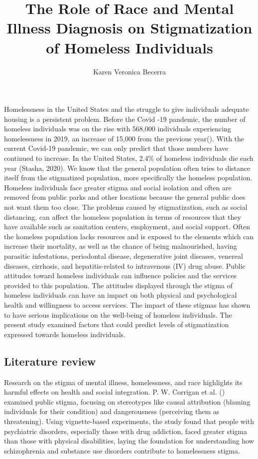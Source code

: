\documentclass[
  man,
  floatsintext,
  longtable,
  nolmodern,
  notxfonts,
  notimes,
  colorlinks=true,linkcolor=blue,citecolor=blue,urlcolor=blue]{apa7}
\title{The Role of Race and Mental Illness Diagnosis on Stigmatization
of Homeless Individuals}
\author{Karen Veronica Becerra}
\affiliation{
{Department of Psychology, The University of Chicago}}
\begin{document}
\maketitle


\setcounter{secnumdepth}{-\maxdimen} %

\setlength\LTleft{0pt}


Homelessness in the United States and the struggle to give individuals
adequate housing is a persistent problem. Before the Covid -19 pandemic,
the number of homeless individuals was on the rise with 568,000
individuals experiencing homelessness in 2019, an increase of 15,000
from the previous
year(). With the
current Covid-19 pandemic, we can only predict that those numbers have
continued to increase. In the United States, 2.4\% of homeless
individuals die each year (Stasha, 2020). We know that the general
population often tries to distance itself from the stigmatized
population, more specifically the homeless population. Homeless
individuals face greater stigma and social isolation and often are
removed from public parks and other locations because the general public
does not want them too close. The problems caused by stigmatization,
such as social distancing, can affect the homeless population in terms
of resources that they have available such as sanitation centers,
employment, and social support. Often the homeless population lacks
resources and is exposed to the elements which can increase their
mortality, as well as the chance of being malnourished, having parasitic
infestations, periodontal disease, degenerative joint diseases, venereal
diseases, cirrhosis, and hepatitis-related to intravenous (IV) drug
abuse. Public attitudes toward homeless individuals can influence
policies and the services provided to this population. The attitudes
displayed through the stigma of homeless individuals can have an impact
on both physical and psychological health and willingness to access
services. The impact of these stigmas has shown to have serious
implications on the well-being of homeless individuals. The present
study examined factors that could predict levels of stigmatization
expressed towards homeless individuals.

\subsection{Literature review}\label{literature-review}

Research on the stigma of mental illness, homelessness, and race
highlights its harmful effects on health and social integration. P. W.
Corrigan et al. ()
examined public stigma, focusing on stereotypes like causal attribution
(blaming individuals for their condition) and dangerousness (perceiving
them as threatening). Using vignette-based experiments, the study found
that people with psychiatric disorders, especially those with drug
addiction, faced greater stigma than those with physical disabilities,
laying the foundation for understanding how schizophrenia and substance
use disorders contribute to homelessness stigma.
\end{document}
